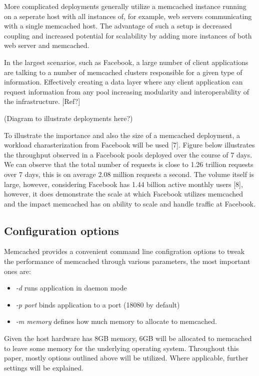 More complicated deployments generally utilize a memcached instance running on a seperate host with all instances of, for example, web servers communicating with a single memcached host. The advantage of such a setup is decreased coupling and increased potential for scalability by adding more instances of both web server and memcached.

In the largest scenarios, such as Facebook, a large number of client applications are talking to a number of memcached clusters responsible for a given type of information. Effectively creating a data layer where any client application can request information from any pool increasing modularity and interoperability of the infrastructure. [Ref?]

(Diagram to illustrate deployments here?)

To illustrate the importance and also the size of a memcached deployment, a workload charasterization from Facebook will be used [7]. Figure below illustrates the throughput observed in a Facebook pools deployed over the course of 7 days. We can observe that the total number of requests is close to 1.26 trillion requests over 7 days, this is on average 2.08 million requests a second. The volume itself is large, however, considering Facebook has 1.44 billion active monthly users [8], however, it does demonstrate the scale at which Facebook utilizes memcached and the impact memcached has on ability to scale and handle traffic at Facebook.



\subsection{Configuration options}
Memcached provides a convenient command line configration options to tweak the performance of memcached through various parameters, the most important ones are:
\begin{itemize}
    \item \emph{-d} runs application in daemon mode
    \item \emph{-p port} binds application to a port (18080 by default)
    \item \emph{-m memory} defines how much memory to allocate to memcached.
\end{itemize}

Given the host hardware has 8GB memory, 6GB will be allocated to memcached to leave some memory for the underlying operating system. Throughout this paper, mostly options outlined above will be utilized. Where applicable, further settings will be explained.
